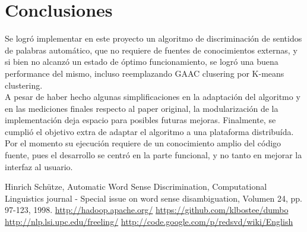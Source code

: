 \documentclass[11pt]{article}
\begin{document}
\section{Conclusiones}
Se logró implementar en este proyecto un algoritmo de discriminación de sentidos de palabras automático, que no requiere de fuentes de conocimientos externas, y si bien no alcanzó un estado de óptimo funcionamiento, se logró una buena performance del mismo, incluso reemplazando GAAC clusering por K-means clustering.\\
A pesar de haber hecho algunas simplificaciones en la adaptación del algoritmo y en las mediciones finales respecto al paper original, la modularización de la implementación deja espacio para posibles futuras mejoras.
Finalmente, se cumplió el objetivo extra de adaptar el algoritmo a una plataforma distribuída. Por el momento su ejecución requiere de un conocimiento amplio del código fuente, pues el desarrollo se centró en la parte funcional, y no tanto en mejorar la interfaz al usuario.

\begin{thebibliography}{99}

 Hinrich Schütze, Automatic Word Sense Discrimination, Computational Linguistics journal - Special issue on word sense disambiguation, Volumen 24, pp. 97-123, 1998.
 \url{http://hadoop.apache.org/}
 \url{https://github.com/klbostee/dumbo}
 \url{http://nlp.lsi.upc.edu/freeling/}
 \url{http://code.google.com/p/redsvd/wiki/English}
\end{thebibliography}
\end{document}
